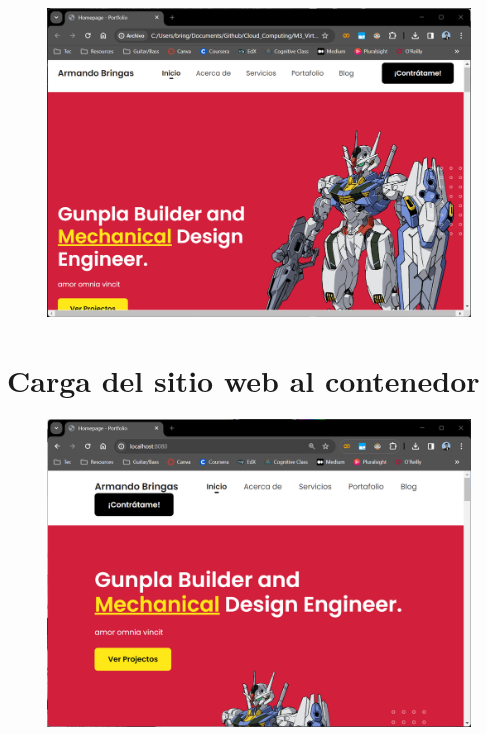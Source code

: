 \documentclass[12pt,a4paper]{article}
\begin{document}
\begin{figure}[H]
    \centering
    \includegraphics[width=1\linewidth]{M3_Virtualización_y_Contenedores/Tarea_3_Creación_Contenedor_Docker/reporte/figuras/5-2_Personalización_Sitio_Web.png}
    \label{fig:Personalización_web_2}
\end{figure}


\section{Carga del sitio web al contenedor}

\begin{figure}[H]
    \centering
    \includegraphics[width=1\linewidth]{M3_Virtualización_y_Contenedores/Tarea_3_Creación_Contenedor_Docker/reporte/figuras/6-1_Carga del_Sitio_Web.png}
    \label{fig:Carga_web_1}
\end{figure}
\end{document}
